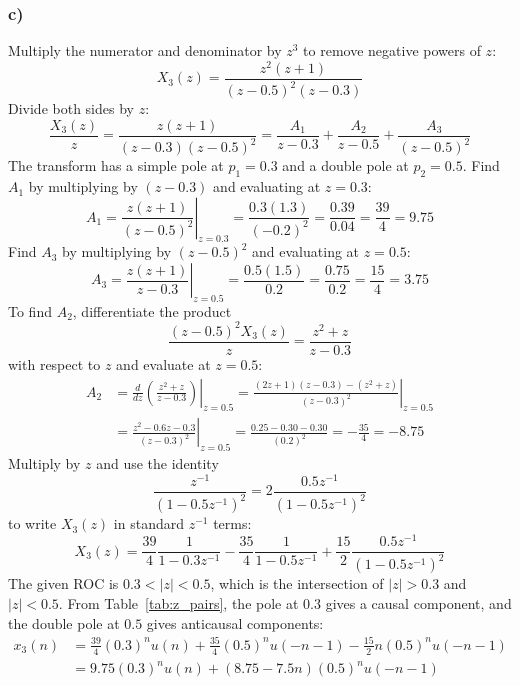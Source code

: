 \documentclass[12pt,a4paper]{article}
\begin{document}
\subsubsection*{c)}
Multiply the numerator and denominator by $z^3$ to remove negative powers of $z$:
\[
X_3(z) = \frac{z^2(z + 1)}{(z - 0.5)^2(z - 0.3)}
\]
Divide both sides by $z$:
\[
\frac{X_3(z)}{z} = \frac{z(z + 1)}{(z - 0.3)(z - 0.5)^2} = \frac{A_1}{z - 0.3} + \frac{A_2}{z - 0.5} + \frac{A_3}{(z - 0.5)^2}
\]
The transform has a simple pole at $p_1 = 0.3$ and a double pole at $p_2 = 0.5$. Find $A_1$ by multiplying by $(z - 0.3)$ and evaluating at $z = 0.3$:
\[
A_1 = \left. \frac{z(z + 1)}{(z - 0.5)^2} \right|_{z = 0.3} = \frac{0.3(1.3)}{(-0.2)^2} = \frac{0.39}{0.04} = \frac{39}{4} = 9.75
\]
Find $A_3$ by multiplying by $(z - 0.5)^2$ and evaluating at $z = 0.5$:
\[
A_3 = \left. \frac{z(z + 1)}{z - 0.3} \right|_{z = 0.5} = \frac{0.5(1.5)}{0.2} = \frac{0.75}{0.2} = \frac{15}{4} = 3.75
\]
To find $A_2$, differentiate the product
\[
\frac{(z - 0.5)^2 X_3(z)}{z} = \frac{z^2 + z}{z - 0.3}
\]
with respect to $z$ and evaluate at $z = 0.5$:
\[
\begin{aligned}
A_2 &= \left. \frac{d}{dz}\left(\frac{z^2 + z}{z - 0.3}\right) \right|_{z = 0.5} = \left. \frac{(2z + 1)(z - 0.3) - (z^2 + z)}{(z - 0.3)^2} \right|_{z = 0.5} \\
&= \left. \frac{z^2 - 0.6z - 0.3}{(z - 0.3)^2} \right|_{z = 0.5} = \frac{0.25 - 0.30 - 0.30}{(0.2)^2} = -\frac{35}{4} = -8.75
\end{aligned}
\]
Multiply by $z$ and use the identity
\[
\frac{z^{-1}}{(1 - 0.5z^{-1})^2} = 2\frac{0.5z^{-1}}{(1 - 0.5z^{-1})^2}
\]
to write $X_3(z)$ in standard $z^{-1}$ terms:
\[
X_3(z) = \frac{39}{4}\frac{1}{1 - 0.3z^{-1}} - \frac{35}{4}\frac{1}{1 - 0.5z^{-1}} + \frac{15}{2}\frac{0.5z^{-1}}{(1 - 0.5z^{-1})^2}
\]
The given ROC is $0.3 < |z| < 0.5$, which is the intersection of $|z| > 0.3$ and $|z| < 0.5$. From Table~\ref{tab:z_pairs}, the pole at $0.3$ gives a causal component, and the double pole at $0.5$ gives anticausal components:
\[
\begin{aligned}
x_3(n) &= \frac{39}{4}(0.3)^n u(n) + \frac{35}{4}(0.5)^n u(-n - 1) - \frac{15}{2}n(0.5)^n u(-n - 1) \\
&= 9.75(0.3)^n u(n) + (8.75 - 7.5n)(0.5)^n u(-n - 1)
\end{aligned}
\]

\end{document}
